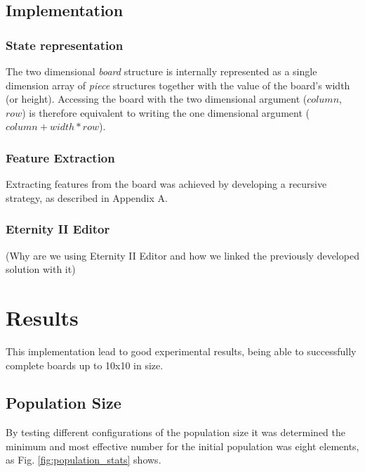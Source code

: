 \documentclass{llncs}
\begin{document}
\subsection{Implementation}\label{sec:implementation}

\subsubsection{State representation}\label{sec:state_representation}

The two dimensional \textit{board} structure is internally represented as a single dimension array of \textit{piece} structures together with the value of the board's width (or height). Accessing the board with the two dimensional argument ($column$, $row$) is therefore equivalent to writing the one dimensional argument ($column + width * row$).


\subsubsection{Feature Extraction}\label{sec:feature_extraction}

Extracting features from the board was achieved by developing a recursive strategy, as described in Appendix A.%

\subsubsection{Eternity II Editor}\label{sec:eternity2_editor}

(Why are we using Eternity II Editor and how we linked the previously developed solution with it)

\section{Results}\label{sec:results}

This implementation lead to good experimental results, being able to successfully complete boards up to 10x10 in size.

\subsection{Population Size}\label{sec:population_size}

By testing different configurations of the population size it was determined the minimum and most effective number for the initial population was eight elements, as Fig. \ref{fig:population_stats} shows.
\end{document}
